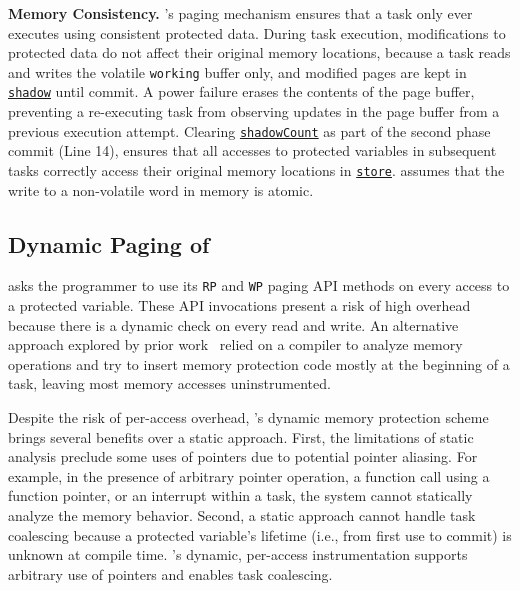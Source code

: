 

\textbf{Memory Consistency.} \sys's paging mechanism ensures that a task only
ever executes using consistent protected data. During task execution,
modifications to protected data do not affect their original memory locations,
because a task reads and writes the volatile \texttt{working} buffer only, and
modified pages are kept in \texttt{\underline{shadow}} until commit.  A power
failure erases the contents of the page buffer, preventing a re-executing task
from observing updates in the page buffer from a previous execution attempt.
Clearing \texttt{\underline{shadowCount}} as part of the second phase commit
(Line 14), ensures that all accesses to protected variables in subsequent tasks
correctly access their original memory locations in \texttt{\underline{store}}.
\sys assumes that the write to a non-volatile word in memory is atomic.
%
\subsection{Dynamic Paging of \sys}

\sys asks the programmer to use its {\tt RP} and {\tt WP} paging API methods on
every access to a protected variable.  These API invocations present a risk of
high overhead because there is a dynamic check on every read and write. An
alternative approach explored by prior work~\cite{alpaca} relied on a compiler
to analyze memory operations and try to insert memory
protection code mostly at the beginning of a task, leaving most memory accesses uninstrumented.  

Despite the risk of per-access overhead, \sys's dynamic memory protection
scheme brings several benefits over a static approach.  First, the limitations
of static analysis preclude some uses of pointers due to potential pointer
aliasing. For example, in the presence of arbitrary pointer operation, a
function call using a function pointer, or an interrupt within a task, the
system cannot statically analyze the memory behavior.   Second, a static approach
cannot handle task coalescing because a protected variable's lifetime (i.e., from first use to commit) is unknown 
at compile time. \sys's dynamic, per-access instrumentation supports arbitrary use of pointers 
and enables task coalescing.
%


